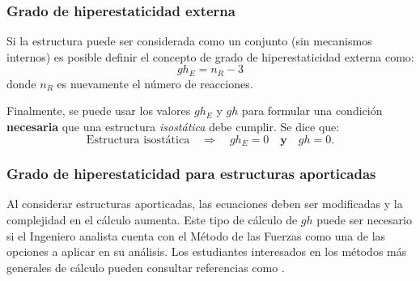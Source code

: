 \subsubsection{Grado de hiperestaticidad externa}
%
Si la estructura puede ser considerada como un conjunto (sin mecanismos internos)  es posible definir el concepto de grado de hiperestaticidad externa como:
%
\begin{equation}
	gh_E = n_{R} - 3
\end{equation}
%
donde $n_R$ es nuevamente el número de reacciones. %
%

Finalmente, se puede usar los valores $gh_E$ y $gh$ para formular una condición \textbf{necesaria} que una estructura \textit{isostática} debe cumplir. %
%
Se dice que:
%
$$
\boxed{
	\text{Estructura isostática} \quad \Rightarrow \quad gh_E = 0 \quad \textbf{y} \quad gh = 0.
}%
$$







\subsubsection{Grado de hiperestaticidad para estructuras aporticadas}

Al considerar estructuras aporticadas, las ecuaciones deben ser modificadas y la complejidad en el cálculo aumenta. Este tipo de cálculo de $gh$ puede ser necesario si el Ingeniero analista cuenta con el Método de las Fuerzas como una de las opciones a aplicar en su análisis. Los estudiantes interesados en los métodos más generales de cálculo pueden consultar referencias como \citep{CerveraRuiz2002ii}. %
%


